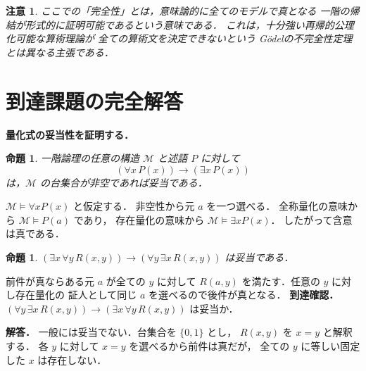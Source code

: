 \documentclass[a5paper,10pt,onecolumn]{jsarticle}
\makeatletter
\theoremstyle{mathnotetheorem}
\newtheorem{proposition}[theorem]{命題}
\newtheorem{remark}[theorem]{注意}
\renewcommand{\proofname}{証明}
\renewenvironment{proof}[1][\proofname]{%
  \par\pushQED{\qed}\normalfont\topsep4\p@\@plus2\p@\relax
  \trivlist\item[\hskip\labelsep\bfseries #1]\ignorespaces
}{\popQED\endtrivlist\@endpefalse}
\makeatother
\begin{document}
\begin{remark}
ここでの「完全性」とは，意味論的に全てのモデルで真となる
一階の帰結が形式的に証明可能であるという意味である．
これは，十分強い再帰的公理化可能な算術理論が
全ての算術文を決定できないという
Gödelの不完全性定理とは異なる主張である．
\end{remark}

\section{到達課題の完全解答}
\noindent\textbf{量化式の妥当性を証明する．}
\begin{proposition}
一階論理の任意の構造 $\mathcal M$ と述語 $P$ に対して
\[
(\forall x\,P(x))\longrightarrow(\exists x\,P(x))
\]
は，$\mathcal M$ の台集合が非空であれば妥当である．
\end{proposition}
\begin{proof}
$\mathcal M\models\forall xP(x)$ と仮定する．
非空性から元 $a$ を一つ選べる．
全称量化の意味から $\mathcal M\models P(a)$ であり，
存在量化の意味から $\mathcal M\models\exists xP(x)$．
したがって含意は真である．
\end{proof}
\begin{proposition}
$(\exists x\,\forall y\,R(x,y))\to
(\forall y\,\exists x\,R(x,y))$ は妥当である．
\end{proposition}
\begin{proof}
前件が真ならある元 $a$ が全ての $y$ に対して
$R(a,y)$ を満たす．任意の $y$ に対し存在量化の
証人として同じ $a$ を選べるので後件が真となる．
\end{proof}
\noindent\textbf{到達確認．}
$(\forall y\,\exists x\,R(x,y))\to
(\exists x\,\forall y\,R(x,y))$ は妥当か．
\par\noindent\textbf{解答．}
一般には妥当でない．台集合を $\{0,1\}$ とし，
$R(x,y)$ を $x=y$ と解釈する．
各 $y$ に対して $x=y$ を選べるから前件は真だが，
全ての $y$ に等しい固定した $x$ は存在しない．
\end{document}
